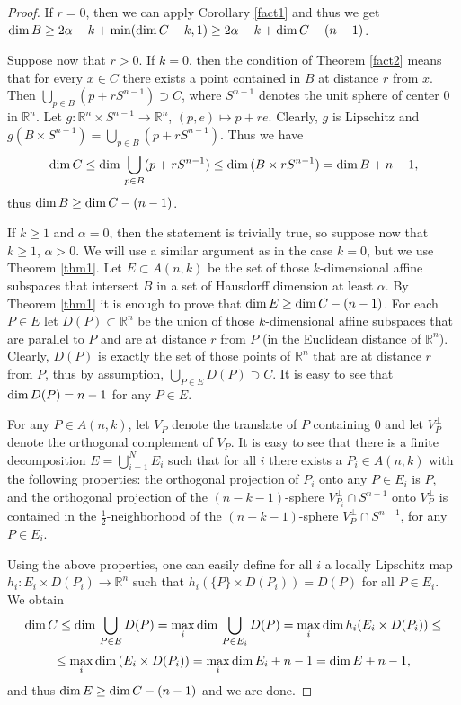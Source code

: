 \documentclass[a4paper]{amsart}
\theoremstyle{definition} \newtheorem{remark}[theorem]{Remark}
\def\rr{{\mathbb R}}
\def\su{\subset}
\def\sp{\supset}
\def\al{\alpha}
\def\dim{{\rm dim}\, }
\begin{document}
\begin{proof}

If $r=0$, then we can apply Corollary \ref{fact1} and thus we get $\dim B \geq 2\al-k +\min(\dim C - k, 1) \geq 2\al-k +\dim C - (n-1)$. 

Suppose now that $r>0$.  
If $k=0$, then the condition of Theorem \ref{fact2} means that for every $x \in C$ there exists a point contained in $B$ at distance $r$ from $x$. 
Then $\bigcup_{p \in B} (p + rS^{n-1}) \sp C$, where $S^{n-1}$ denotes the unit sphere of center $0$ in $\rr^n$. 
Let $g: \rr^n \times S^{n-1} \to \rr^n$, $(p,e) \mapsto p+r e$. Clearly, $g$ is Lipschitz and  
$g(B \times S^{n-1})=\bigcup_{p \in B} (p + rS^{n-1})$. Thus we have 
$$\dim C \leq \dim \bigcup_{p \in B} (p + rS^{n-1}) \leq \dim (B \times rS^{n-1}) =\dim B + n-1,$$ thus 
$\dim B \geq \dim C - (n-1)$. 

If $k \geq 1$ and $\al=0$, then the statement is trivially true, %
so suppose now that $k \geq 1$, $\al >0$. We will use a similar argument as in the case $k=0$, but we use Theorem \ref{thm1}. 
Let $E \su A(n,k)$ be the set of those $k$-dimensional affine subspaces that intersect
$B$ in a set of Hausdorff dimension at least $\al$. 
By Theorem \ref{thm1} it
is enough to prove that $\dim E \geq \dim C - (n-1)$. 
For each $P \in E$ let $D(P) \su \rr^n$ be the union of those
$k$-dimensional affine subspaces that are parallel to $P$ and are at distance $r$ from $P$ (in
the Euclidean distance of $\rr^n$).
Clearly, $D(P)$ is exactly the set of those points of $\rr^n$ that
are at distance $r$ from $P$, thus by assumption, $\bigcup_{P \in E} D(P) \sp C$. 
It is easy to see that $\dim D(P)=n-1$ for any $P \in E$.

For any $P \in A(n,k)$, let $V_P$ denote the translate of $P$ containing $0$ and let $V_P^{\perp}$ denote the orthogonal complement of $V_P$. 
It is easy to see that there is a finite decomposition $E=\bigcup_{i=1}^{N} E_i$ such that for all $i$ 
there exists a $P_i \in A(n,k)$ with the following properties: 
the orthogonal projection of $P_i$ onto any
$P\in E_i$ is $P$, and the orthogonal projection of the $(n-k-1)$-sphere $V_{P_i}^{\perp} \cap S^{n-1}$ onto $V_P^{\perp}$ is contained in the
$\frac{1}{2}$-neighborhood of the $(n-k-1)$-sphere $V_P^{\perp} \cap S^{n-1}$, for any $P \in E_i$. 

Using the above properties, one can easily define for all $i$ a locally Lipschitz map  
$h_i: E_i \times D(P_i) \to \rr^n$ such that $h_i(\{P\} \times D(P_i))=D(P)$ for all $P \in E_i$. 
 We obtain 
$$\dim C \leq \dim \bigcup_{P \in E} D(P) =\max_i \dim \bigcup_{P \in E_i} D(P) = \max_i \dim h_i(E_i \times D(P_i)) \leq$$
$$ \leq \max_i \dim (E_i \times D(P_i)) = \max_i \dim E_i + n-1= \dim E + n-1,$$  
and thus $\dim E \geq \dim C - (n-1)$ and we are done. 
\end{proof}
\end{document}

